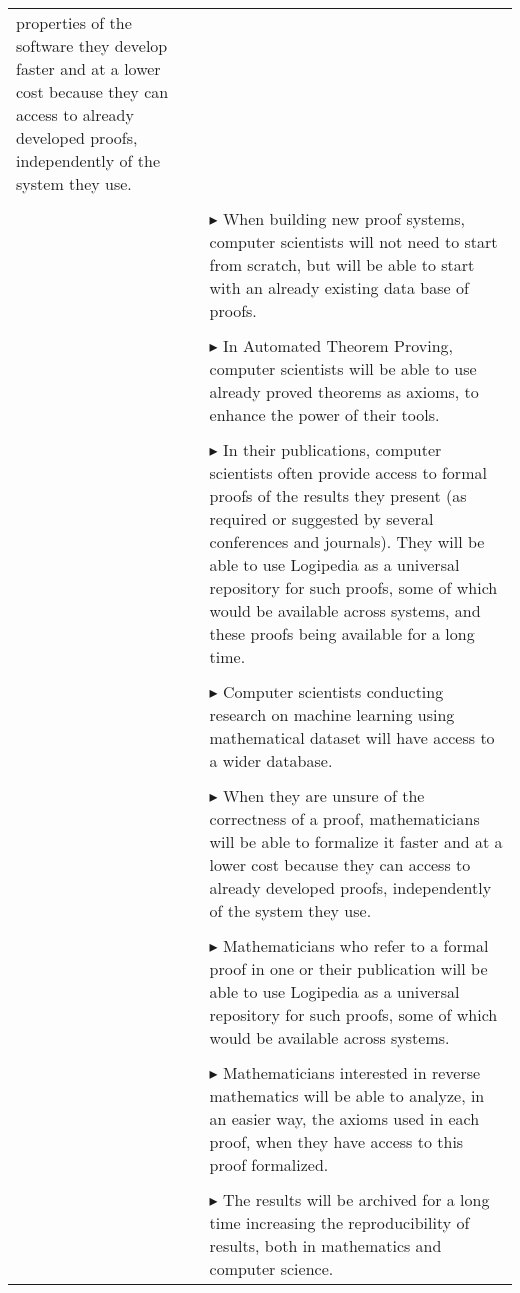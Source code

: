\begin{longtable}{|p{}|p{}|}
  properties of the software they develop faster and at a lower cost
  because they can access to already developed proofs, independently
  of the system they use.
\\
&\\
&
$\blacktriangleright$ When building new proof systems, computer scientists will not
  need to start from scratch, but will be able to start with an already
  existing data base of proofs.
\\
&\\
&
$\blacktriangleright$ In Automated Theorem Proving, computer scientists will be able
  to use already proved theorems as axioms, to enhance the power of
  their tools.
\\
&\\
&
$\blacktriangleright$ In their publications, computer scientists often provide access
  to formal proofs of the results they present (as required or
  suggested by several conferences and journals). They will be able to
  use Logipedia as a universal repository for such proofs, some of
  which would be available across systems, and these proofs being
  available for a long time.
\\
&\\
&
$\blacktriangleright$ Computer scientists conducting research on machine learning
  using mathematical dataset will have access to a wider database.
\\
&\\
&
$\blacktriangleright$ When they are unsure of the correctness of a proof,
  mathematicians will be able to formalize it faster and at a lower
  cost because they can access to already developed proofs,
  independently of the system they use.
\\
&\\
&
$\blacktriangleright$ Mathematicians who refer to a formal proof in one or their
  publication will be able to use Logipedia as a universal
  repository for such proofs, some of which would be available across
  systems.
\\
&\\
&
$\blacktriangleright$ Mathematicians interested in reverse mathematics will be able to
  analyze, in an easier way, the axioms used in each proof, when they
  have access to this proof formalized.
\\
&\\
&
$\blacktriangleright$ The results will be archived for a long time increasing the
  reproducibility of results, both in mathematics and computer science.
\\

\end{longtable}
